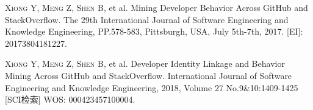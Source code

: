
\begin{publications}{99}
    \item\textsc{Xiong Y, Meng Z, Shen B}, et al. {Mining Developer Behavior Across GitHub and StackOverflow}. The 29th International Journal of Software Engineering and Knowledge Engineering, PP.578-583, Pittsburgh, USA, July 5th-7th, 2017. [EI]: 20173804181227.
    \item\textsc{Xiong Y, Meng Z, Shen B}, et al. {Developer Identity Linkage and Behavior Mining Across GitHub and StackOverflow}. International Journal of Software Engineering and Knowledge Engineering, 2018, Volume 27 No.9\&10:1409-1425 [SCI检索] WOS: 000423457100004.
\end{publications}
